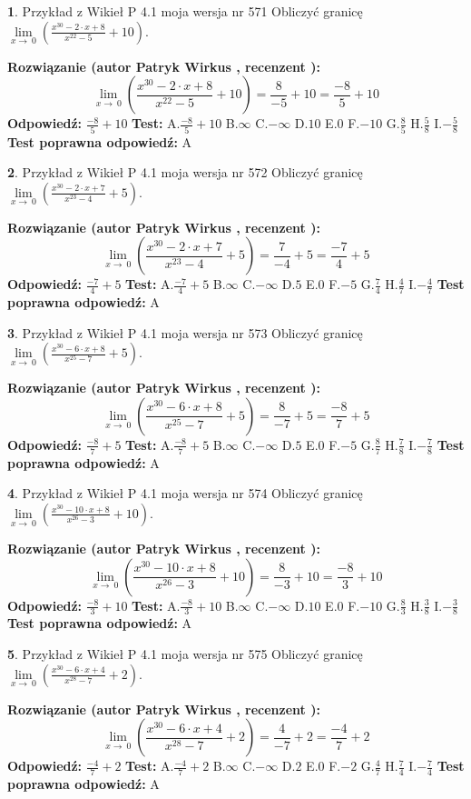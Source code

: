 \documentclass[12pt, a4paper]{article}
\theoremstyle{definition} %
\newtheorem{zad}{}
\newcommand{\zadStart}[1]{\begin{zad}#1\newline}
\newcommand{\zadStop}{\end{zad}}
\newcommand{\rozwStart}[2]{\noindent \textbf{Rozwiązanie (autor #1 , recenzent #2): }\newline}
\newcommand{\rozwStop}{\newline}
\newcommand{\odpStart}{\noindent \textbf{Odpowiedź:}\newline}
\newcommand{\odpStop}{\newline}
\newcommand{\testStart}{\noindent \textbf{Test:}\newline}
\newcommand{\testStop}{\newline}
\newcommand{\kluczStart}{\noindent \textbf{Test poprawna odpowiedź:}\newline}
\newcommand{\kluczStop}{\newline}
\begin{document}
\zadStart{Przykład z Wikieł P 4.1 moja wersja nr 571}
Obliczyć granicę $\lim\limits_{x\to\ 0}(\frac{x^{30}-2 \cdot x +8}{x^{22}-5}+10)$.
\zadStop
\rozwStart{Patryk Wirkus}{}
$$\lim\limits_{x\to\ 0}(\frac{x^{30}-2 \cdot x +8}{x^{22}-5}+10)=\frac{8}{-5}+10=\frac{-8}{5}+10$$
\rozwStop
\odpStart
$\frac{-8}{5}+10$
\odpStop
\testStart
A.$\frac{-8}{5}+10$
B.$\infty$
C.$-\infty$
D.$10$
E.$0$
F.$-10$
G.$\frac{8}{5}$
H.$\frac{5}{8}$
I.$-\frac{5}{8}$
\testStop
\kluczStart
A
\kluczStop



\zadStart{Przykład z Wikieł P 4.1 moja wersja nr 572}
Obliczyć granicę $\lim\limits_{x\to\ 0}(\frac{x^{30}-2 \cdot x +7}{x^{23}-4}+5)$.
\zadStop
\rozwStart{Patryk Wirkus}{}
$$\lim\limits_{x\to\ 0}(\frac{x^{30}-2 \cdot x +7}{x^{23}-4}+5)=\frac{7}{-4}+5=\frac{-7}{4}+5$$
\rozwStop
\odpStart
$\frac{-7}{4}+5$
\odpStop
\testStart
A.$\frac{-7}{4}+5$
B.$\infty$
C.$-\infty$
D.$5$
E.$0$
F.$-5$
G.$\frac{7}{4}$
H.$\frac{4}{7}$
I.$-\frac{4}{7}$
\testStop
\kluczStart
A
\kluczStop



\zadStart{Przykład z Wikieł P 4.1 moja wersja nr 573}
Obliczyć granicę $\lim\limits_{x\to\ 0}(\frac{x^{30}-6 \cdot x +8}{x^{25}-7}+5)$.
\zadStop
\rozwStart{Patryk Wirkus}{}
$$\lim\limits_{x\to\ 0}(\frac{x^{30}-6 \cdot x +8}{x^{25}-7}+5)=\frac{8}{-7}+5=\frac{-8}{7}+5$$
\rozwStop
\odpStart
$\frac{-8}{7}+5$
\odpStop
\testStart
A.$\frac{-8}{7}+5$
B.$\infty$
C.$-\infty$
D.$5$
E.$0$
F.$-5$
G.$\frac{8}{7}$
H.$\frac{7}{8}$
I.$-\frac{7}{8}$
\testStop
\kluczStart
A
\kluczStop



\zadStart{Przykład z Wikieł P 4.1 moja wersja nr 574}
Obliczyć granicę $\lim\limits_{x\to\ 0}(\frac{x^{30}-10 \cdot x +8}{x^{26}-3}+10)$.
\zadStop
\rozwStart{Patryk Wirkus}{}
$$\lim\limits_{x\to\ 0}(\frac{x^{30}-10 \cdot x +8}{x^{26}-3}+10)=\frac{8}{-3}+10=\frac{-8}{3}+10$$
\rozwStop
\odpStart
$\frac{-8}{3}+10$
\odpStop
\testStart
A.$\frac{-8}{3}+10$
B.$\infty$
C.$-\infty$
D.$10$
E.$0$
F.$-10$
G.$\frac{8}{3}$
H.$\frac{3}{8}$
I.$-\frac{3}{8}$
\testStop
\kluczStart
A
\kluczStop



\zadStart{Przykład z Wikieł P 4.1 moja wersja nr 575}
Obliczyć granicę $\lim\limits_{x\to\ 0}(\frac{x^{30}-6 \cdot x +4}{x^{28}-7}+2)$.
\zadStop
\rozwStart{Patryk Wirkus}{}
$$\lim\limits_{x\to\ 0}(\frac{x^{30}-6 \cdot x +4}{x^{28}-7}+2)=\frac{4}{-7}+2=\frac{-4}{7}+2$$
\rozwStop
\odpStart
$\frac{-4}{7}+2$
\odpStop
\testStart
A.$\frac{-4}{7}+2$
B.$\infty$
C.$-\infty$
D.$2$
E.$0$
F.$-2$
G.$\frac{4}{7}$
H.$\frac{7}{4}$
I.$-\frac{7}{4}$
\testStop
\kluczStart
A
\kluczStop
\end{document}
